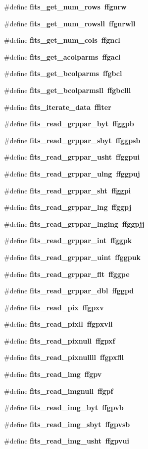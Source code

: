 \begin{CompactItemize}
\item 
\#define \bf{fits\_\-get\_\-num\_\-rows}~ffgnrw
\item 
\#define \bf{fits\_\-get\_\-num\_\-rowsll}~ffgnrwll
\item 
\#define \bf{fits\_\-get\_\-num\_\-cols}~ffgncl
\item 
\#define \bf{fits\_\-get\_\-acolparms}~ffgacl
\item 
\#define \bf{fits\_\-get\_\-bcolparms}~ffgbcl
\item 
\#define \bf{fits\_\-get\_\-bcolparmsll}~ffgbclll
\item 
\#define \bf{fits\_\-iterate\_\-data}~ffiter
\item 
\#define \bf{fits\_\-read\_\-grppar\_\-byt}~ffggpb
\item 
\#define \bf{fits\_\-read\_\-grppar\_\-sbyt}~ffggpsb
\item 
\#define \bf{fits\_\-read\_\-grppar\_\-usht}~ffggpui
\item 
\#define \bf{fits\_\-read\_\-grppar\_\-ulng}~ffggpuj
\item 
\#define \bf{fits\_\-read\_\-grppar\_\-sht}~ffggpi
\item 
\#define \bf{fits\_\-read\_\-grppar\_\-lng}~ffggpj
\item 
\#define \bf{fits\_\-read\_\-grppar\_\-lnglng}~ffggpjj
\item 
\#define \bf{fits\_\-read\_\-grppar\_\-int}~ffggpk
\item 
\#define \bf{fits\_\-read\_\-grppar\_\-uint}~ffggpuk
\item 
\#define \bf{fits\_\-read\_\-grppar\_\-flt}~ffggpe
\item 
\#define \bf{fits\_\-read\_\-grppar\_\-dbl}~ffggpd
\item 
\#define \bf{fits\_\-read\_\-pix}~ffgpxv
\item 
\#define \bf{fits\_\-read\_\-pixll}~ffgpxvll
\item 
\#define \bf{fits\_\-read\_\-pixnull}~ffgpxf
\item 
\#define \bf{fits\_\-read\_\-pixnullll}~ffgpxfll
\item 
\#define \bf{fits\_\-read\_\-img}~ffgpv
\item 
\#define \bf{fits\_\-read\_\-imgnull}~ffgpf
\item 
\#define \bf{fits\_\-read\_\-img\_\-byt}~ffgpvb
\item 
\#define \bf{fits\_\-read\_\-img\_\-sbyt}~ffgpvsb
\item 
\#define \bf{fits\_\-read\_\-img\_\-usht}~ffgpvui
\item 

\end{CompactItemize}
